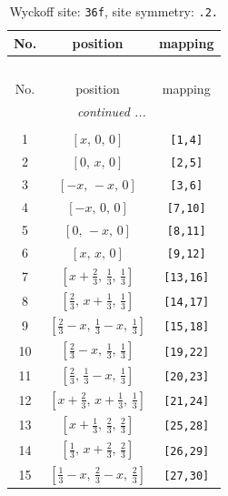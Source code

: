 \documentclass[fleqn,8pt]{jsarticle}
\begin{document}
\renewcommand{\arraystretch}{1.2}
\begin{longtable}{ccc}
\caption{Wyckoff site: {\tt 36f}, site symmetry: {\tt .2.}}
 \\
 \hline \hline
No. & position & mapping \\ \hline \endfirsthead

\multicolumn{2}{l}{\tablename\ \thetable{}} \\
 \hline \hline
No. & position & mapping \\ \hline \endhead

 \hline \hline
\multicolumn{2}{r}{\footnotesize\it continued ...} \\ \endfoot

 \hline \hline
\multicolumn{2}{r}{} \\ \endlastfoot

1 & $\left[ x,\, 0,\, 0 \right]$ & {\tt [1,4]} \\ \hline
2 & $\left[ 0,\, x,\, 0 \right]$ & {\tt [2,5]} \\ \hline
3 & $\left[ - x,\, - x,\, 0 \right]$ & {\tt [3,6]} \\ \hline
4 & $\left[ - x,\, 0,\, 0 \right]$ & {\tt [7,10]} \\ \hline
5 & $\left[ 0,\, - x,\, 0 \right]$ & {\tt [8,11]} \\ \hline
6 & $\left[ x,\, x,\, 0 \right]$ & {\tt [9,12]} \\ \hline
7 & $\left[ x + \frac{2}{3},\, \frac{1}{3},\, \frac{1}{3} \right]$ & {\tt [13,16]} \\ \hline
8 & $\left[ \frac{2}{3},\, x + \frac{1}{3},\, \frac{1}{3} \right]$ & {\tt [14,17]} \\ \hline
9 & $\left[ \frac{2}{3} - x,\, \frac{1}{3} - x,\, \frac{1}{3} \right]$ & {\tt [15,18]} \\ \hline
10 & $\left[ \frac{2}{3} - x,\, \frac{1}{3},\, \frac{1}{3} \right]$ & {\tt [19,22]} \\ \hline
11 & $\left[ \frac{2}{3},\, \frac{1}{3} - x,\, \frac{1}{3} \right]$ & {\tt [20,23]} \\ \hline
12 & $\left[ x + \frac{2}{3},\, x + \frac{1}{3},\, \frac{1}{3} \right]$ & {\tt [21,24]} \\ \hline
13 & $\left[ x + \frac{1}{3},\, \frac{2}{3},\, \frac{2}{3} \right]$ & {\tt [25,28]} \\ \hline
14 & $\left[ \frac{1}{3},\, x + \frac{2}{3},\, \frac{2}{3} \right]$ & {\tt [26,29]} \\ \hline
15 & $\left[ \frac{1}{3} - x,\, \frac{2}{3} - x,\, \frac{2}{3} \right]$ & {\tt [27,30]} \\ \hline

\end{longtable}
\end{document}
